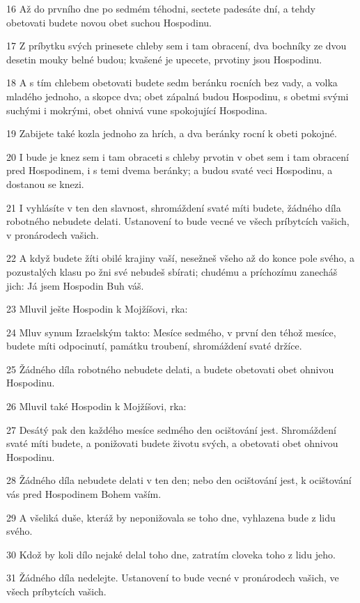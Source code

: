 \par 16 Až do prvního dne po sedmém téhodni, sectete padesáte dní, a tehdy obetovati budete novou obet suchou Hospodinu.
\par 17 Z príbytku svých prinesete chleby sem i tam obracení, dva bochníky ze dvou desetin mouky belné budou; kvašené je upecete, prvotiny jsou Hospodinu.
\par 18 A s tím chlebem obetovati budete sedm beránku rocních bez vady, a volka mladého jednoho, a skopce dva; obet zápalná budou Hospodinu, s obetmi svými suchými i mokrými, obet ohnivá vune spokojující Hospodina.
\par 19 Zabijete také kozla jednoho za hrích, a dva beránky rocní k obeti pokojné.
\par 20 I bude je knez sem i tam obraceti s chleby prvotin v obet sem i tam obracení pred Hospodinem, i s temi dvema beránky; a budou svaté veci Hospodinu, a dostanou se knezi.
\par 21 I vyhlásíte v ten den slavnost, shromáždení svaté míti budete, žádného díla robotného nebudete delati. Ustanovení to bude vecné ve všech príbytcích vašich, v pronárodech vašich.
\par 22 A když budete žíti obilé krajiny vaší, nesežneš všeho až do konce pole svého, a pozustalých klasu po žni své nebudeš sbírati; chudému a príchozímu zanecháš jich: Já jsem Hospodin Buh váš.
\par 23 Mluvil ješte Hospodin k Mojžíšovi, rka:
\par 24 Mluv synum Izraelským takto: Mesíce sedmého, v první den téhož mesíce, budete míti odpocinutí, památku troubení, shromáždení svaté držíce.
\par 25 Žádného díla robotného nebudete delati, a budete obetovati obet ohnivou Hospodinu.
\par 26 Mluvil také Hospodin k Mojžíšovi, rka:
\par 27 Desátý pak den každého mesíce sedmého den ocištování jest. Shromáždení svaté míti budete, a ponižovati budete životu svých, a obetovati obet ohnivou Hospodinu.
\par 28 Žádného díla nebudete delati v ten den; nebo den ocištování jest, k ocištování vás pred Hospodinem Bohem vaším.
\par 29 A všeliká duše, kteráž by neponižovala se toho dne, vyhlazena bude z lidu svého.
\par 30 Kdož by koli dílo nejaké delal toho dne, zatratím cloveka toho z lidu jeho.
\par 31 Žádného díla nedelejte. Ustanovení to bude vecné v pronárodech vašich, ve všech príbytcích vašich.

